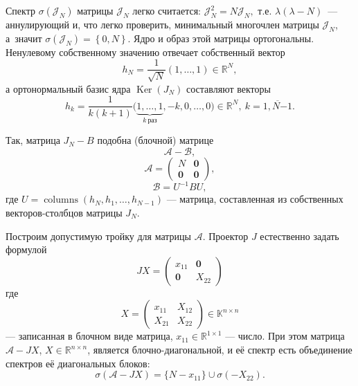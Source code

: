 \documentclass[12pt]{article}
\theoremstyle{definition}
\begin{document}
Спектр \( \sigma\left( \mathcal{J}_N \right) \)
    матрицы \( \mathcal{J}_N \) легко считается:
    \( \mathcal{J}_N^2 = N \mathcal{J}_N, \) т.е.
    \( \lambda(\lambda - N) \)~--- аннулирующий и, что легко проверить,
    минимальный многочлен матрицы \( \mathcal{J}_N \), а~значит
    \( \sigma\left( \mathcal{J}_N \right) = \left\{ 0,N \right\}. \)
Ядро и образ этой матрицы ортогональны.
Ненулевому собственному значению
    отвечает собственный вектор
    \[
        h_N = \frac{1}{\sqrt{N}}(1,\ldots, 1)\in\mathbb{R}^N,
        \]
    а ортонормальный базис ядра \( \operatorname{Ker}(J_N) \)
    составляют векторы
    \[
        h_k = \frac{1}{k(k+1)}
        \big(\underbrace{1,\ldots, 1}_{k\ \text{раз}}, -k, 0, \ldots, 0\big)
        \in\mathbb{R}^N,
        \ k=\overline{1,N{-1}}.
        \]

Так, матрица \( J_N-B \) подобна (блочной) матрице
    \[
        \mathcal{A} - \mathcal{B}, \]
    \[
        \mathcal{A} = \left(\begin{array}{c|c}
        N & \mathbf{0} \\ \hline
        \mathbf{0} & \mathbf{0}
        \end{array}\right),
        \]
    \[
        \mathcal{B} = U^{-1}B U,
        \]
    где \( U=\operatorname{columns}(h_N, h_1, \ldots, h_{N-1}) \)
    --- матрица, составленная из собственных векторов-столбцов матрицы \( J_N \).

Построим допустимую тройку для матрицы \( \mathcal{A} \).
Проектор \( J \) естественно задать формулой
    \[
        JX =
        \left(\begin{array}{c|c}
        x_{11} & \mathbf{0} \\ \hline
        \mathbf{0} & X_{22}
        \end{array}\right)
        \]
где
    \[
        X =
        \left(\begin{array}{c|c}
        x_{11} & X_{12} \\ \hline
        X_{21} & X_{22}
        \end{array}\right)\in\mathbb{K}^{n{\times}n}
        \]
        --- записанная в блочном виде матрица,
        \( x_{11}\in\mathbb{R}^{1\times 1} \) --- число.
При этом матрица \( \mathcal{A} - JX \),
    \( X\in\mathbb{R}^{n{\times}n} \),
    является блочно-диагональной,
    и её спектр есть объединение спектров её диагональных блоков:
    \[
        \sigma(\mathcal{A} - JX)
        = \{ N - x_{11} \} \cup \sigma(-X_{22}).
        \]
\end{document}

